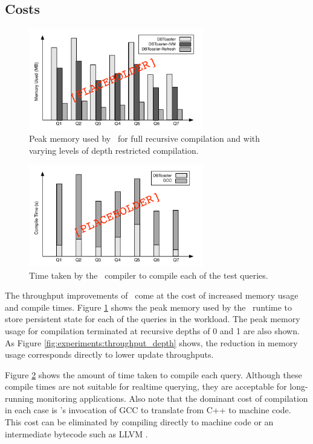 \subsection{Costs}
\begin{figure}
\begin{center}
\includegraphics[width=3in]{../graphics-tmp/placeholder_memory_all}
\end{center}
\label{fig:experiments:memory}
\caption{Peak memory used by \dbtoaster\ for full recursive compilation and with varying levels of depth restricted compilation.}
\end{figure}

\begin{figure}
\begin{center}
\includegraphics[width=3in]{../graphics-tmp/placeholder_compile_all}
\end{center}
\label{fig:experiments:compile}
\caption{Time taken by the \dbtoaster\ compiler to compile each of the test queries.}
\end{figure}

The throughput improvements of \dbtoaster\ come at the cost of increased memory usage and compile times.  Figure \ref{fig:experiments:memory} shows the peak memory used by the \dbtoaster\ runtime to store persistent state for each of the queries in the workload.  The peak memory usage for compilation terminated at recursive depths of 0 and 1 are also shown.  As Figure \ref{fig:experiments:throughput_depth} shows, the reduction in memory usage corresponds directly to lower update throughputs.

Figure \ref{fig:experiments:compile} shows the amount of time taken to compile each query.  Although these compile times are not suitable for realtime querying, they are acceptable for long-running monitoring applications.  Also note that the dominant cost of compilation in each case is \dbtoaster 's invocation of GCC to translate from C++ to machine code.  This cost can be eliminated by compiling directly to machine code or an intermediate bytecode such as LLVM \cite{llvm}.


